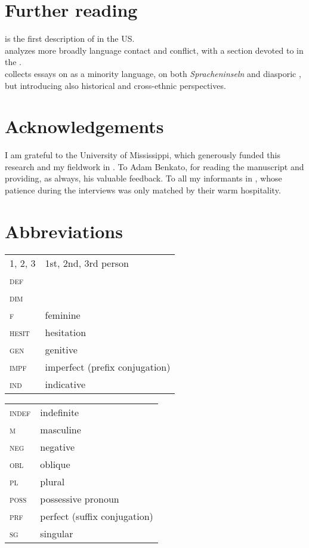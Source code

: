 \documentclass[output=paper]{langsci/langscibook}
\begin{document}
\section*{Further reading}

 \citet{Rouchdy_arabic_1992} is the first description of  in the US.\\
 \citet{Rouchdy2002} analyzes more broadly language contact and conflict, with a section devoted to  in the .\\
 \citet{Owens2000editor} collects essays on  as a minority language,  on both \textit{Spracheninseln} and diasporic , but introducing also historical and cross-ethnic perspectives.
 
 \section*{Acknowledgements}
I am grateful to the University of Mississippi, which generously funded this research and my fieldwork in . To Adam Benkato, for reading the manuscript and providing, as always, his valuable feedback. To all my informants in , whose patience during the interviews was only matched by their warm hospitality.
 
 \section*{Abbreviations}

\begin{tabularx}{.55\textwidth}{@{}lQ@{}}
\textsc{1, 2, 3} & 1st, 2nd, 3rd person \\
\textsc{def} &   \\
\textsc{dim} &  \\
\textsc{f} & feminine \\
\textsc{hesit} & hesitation \\
\textsc{gen} & genitive \\
\textsc{impf} & imperfect (prefix conjugation) \\
\textsc{ind} & indicative \\
\end{tabularx}%
\begin{tabularx}{.5\textwidth}{@{}lQ@{}}
\textsc{indef} & indefinite \\
\textsc{m} & masculine \\
\textsc{neg} & negative \\
\textsc{obl} & oblique \\
\textsc{pl} & plural \\
\textsc{poss} & possessive pronoun \\
\textsc{prf} & perfect (suffix conjugation) \\
\textsc{sg} & singular \\
\end{tabularx}%


\sloppy\printbibliography[heading=subbibliography,notkeyword=this]
\end{document}
